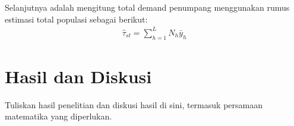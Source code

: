\documentclass{article}
\begin{document}
Selanjutnya adalah mengitung total demand penumpang menggunakan rumus estimasi total populasi sebagai berikut:
\begin{align}
    \hat{\tau}_{st} = \sum_{h=1}^{L} N_{h} \bar{y}_{h}
\end{align}

\section{Hasil dan Diskusi}
Tuliskan hasil penelitian dan diskusi hasil di sini, termasuk persamaan matematika yang diperlukan.

\printbibliography %
\end{document}
